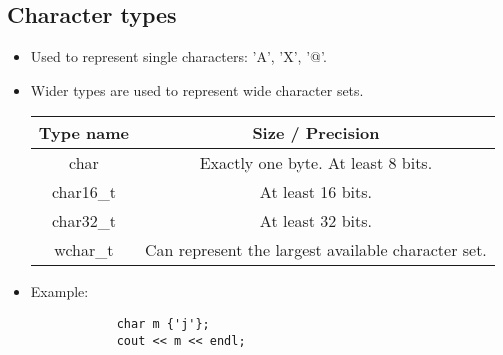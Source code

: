 \subsection{Character types}
\begin{itemize}
    \item Used to represent single characters: 'A', 'X', '@'.
    \item Wider types are used to represent wide character sets.
        \begin{center}
            \begin{tabular}{ |c|c| }
                \hline
                    Type name & Size / Precision \\
                \hline
                    char & Exactly one byte. At least 8 bits. \\ 
                    char16\_t & At least 16 bits. \\
                    char32\_t & At least 32 bits. \\
                    wchar\_t & Can represent the largest available character set. \\
                \hline
            \end{tabular}
        \end{center}
    
    \item Example: 
        \begin{verbatim}
            char m {'j'};
            cout << m << endl;
        \end{verbatim}
\end{itemize}

